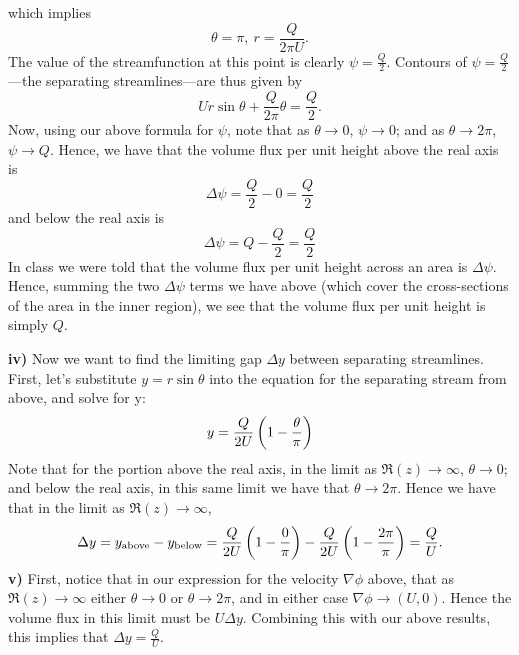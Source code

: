 \documentclass{article}
\begin{document}
%
which implies
%
\begin{equation*}
    \theta = \pi, \ r = \frac{Q}{2 \pi U}
    .
\end{equation*}
%
The value of the streamfunction at this point is clearly $\psi =
\frac{Q}{2}$. Contours of $\psi = \frac{Q}{2}$---the separating
streamlines---are thus given by
%
\begin{equation*}
    U r \sin \theta + \frac{Q}{2 \pi} \theta = \frac{Q}{2}
    .
\end{equation*}
%
Now, using our above formula for $\psi$, note that as $\theta \to 0$,
$\psi \to 0$; and as $\theta \to 2 \pi$, $\psi \to Q$. Hence, we have
that the volume flux per unit height above the real axis is
%
\begin{equation*}
    \Delta \psi = \frac{Q}{2} - 0 = \frac{Q}{2}
\end{equation*}
%
and below the real axis is
%
\begin{equation*}
    \Delta \psi = Q - \frac{Q}{2} = \frac{Q}{2}
\end{equation*}
%
In class we were told that the volume flux per unit height across an
area is $\Delta \psi$. Hence, summing the two $\Delta \psi$ terms we
have above (which cover the cross-sections of the area in the inner
region), we see that the volume flux per unit height is simply $Q$.

\textbf{iv)} Now we want to find the limiting gap $\Delta y$ between
separating streamlines. First, let's substitute $y = r \sin \theta$ into
the equation for the separating stream from above, and solve for y:
%
\begin{equation*}
    y = \frac{Q}{2 U} \del{1 - \frac{\theta}{\pi}}
\end{equation*}
%
Note that for the portion above the real axis, in the limit as $\Re(z)
\to \infty$, $\theta \to 0$; and below the real axis, in this same limit
we have that $\theta \to 2 \pi$. Hence we have that in the limit as
$\Re(z) \to \infty$,
%
\begin{equation*}
    \Delta y
        = y_{\text{above}} - y_{\text{below}}
        = \frac{Q}{2 U} \del{1 - \frac{0}{\pi}}
            - \frac{Q}{2 U} \del{1 - \frac{2 \pi}{\pi}}
        = \frac{Q}{U}
    .
\end{equation*}
%
\textbf{v)} First, notice that in our expression for the velocity
$\nabla \phi$ above, that as $\Re(z) \to \infty$ either $\theta \to 0$
or $\theta \to 2 \pi$, and in either case $\nabla \phi \to (U, 0)$.
Hence the volume flux in this limit must be $U \Delta y$. Combining this
with our above results, this implies that $\Delta y = \frac{Q}{U}$.
\end{document}
